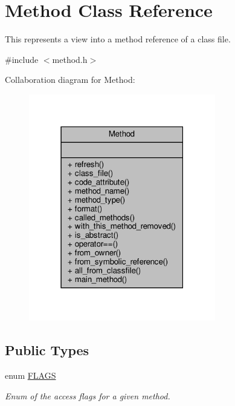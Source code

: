 \hypertarget{classMethod}{}\section{Method Class Reference}
\label{classMethod}


This represents a view into a method reference of a class file.  




{\ttfamily \#include $<$method.\+h$>$}



Collaboration diagram for Method\+:\nopagebreak
\begin{figure}[H]
\begin{center}
\leavevmode
\includegraphics[width=231pt]{classMethod__coll__graph}
\end{center}
\end{figure}
\subsection*{Public Types}
\begin{DoxyCompactItemize}
\item 
\mbox{\label{classMethod_a142a92c7e2c79cbbedb7fd08a8a8e1ad}} 
enum \hyperlink{classMethod_a142a92c7e2c79cbbedb7fd08a8a8e1ad}{F\+L\+A\+GS} \begin{DoxyCompactList}\small\item\em Enum of the access flags for a given method. \end{DoxyCompactList}
\end{DoxyCompactItemize}
